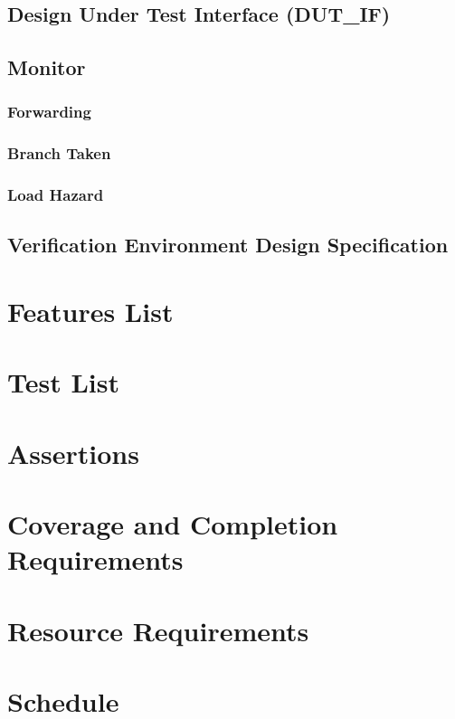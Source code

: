 \documentclass{article}
\begin{document}
	\subsection{Design Under Test Interface (DUT_IF)}
	
	\subsection{Monitor}
	
	\subsubsection{Forwarding}
	
	\subsubsection{Branch Taken}
	
	\subsubsection{Load Hazard}
	
	\subsection{Verification Environment Design Specification}
	
	\section{Features List}
	
	\section{Test List}
	
	\section{Assertions}
	
	\section{Coverage and Completion Requirements}

	\section{Resource Requirements}
	
	\section{Schedule}
	
		
	
\end{document}
